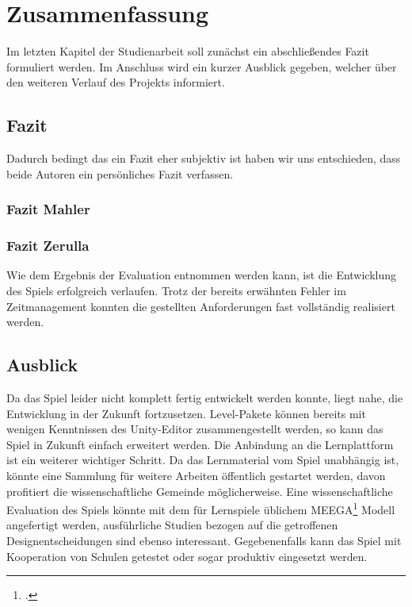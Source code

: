 \section{Zusammenfassung}
Im letzten Kapitel der Studienarbeit soll zunächst ein abschließendes Fazit formuliert werden. Im Anschluss wird ein kurzer Ausblick gegeben, welcher über den weiteren Verlauf des Projekts informiert.

\subsection{Fazit}

	Dadurch bedingt das ein Fazit eher subjektiv ist haben wir uns entschieden, dass beide Autoren ein persönliches Fazit verfassen.
	\subsubsection{Fazit Mahler}
	\subsubsection{Fazit Zerulla}

Wie dem Ergebnis der Evaluation entnommen werden kann, ist die Entwicklung des Spiels erfolgreich verlaufen. Trotz der bereits erwähnten Fehler im Zeitmanagement konnten die gestellten Anforderungen fast vollständig realisiert werden. 




\subsection{Ausblick}
	Da das Spiel leider nicht komplett fertig entwickelt werden konnte, liegt nahe, die Entwicklung in der Zukunft fortzusetzen. Level-Pakete können bereits mit wenigen Kenntnissen des Unity-Editor zusammengestellt werden, so kann das Spiel in Zukunft einfach erweitert werden. Die Anbindung an die Lernplattform ist ein weiterer wichtiger Schritt.
	Da das Lernmaterial vom Spiel unabhängig ist, könnte eine Sammlung für weitere Arbeiten öffentlich gestartet werden, davon profitiert die wissenschaftliche Gemeinde möglicherweise.
	Eine wissenschaftliche Evaluation des Spiels könnte mit dem für Lernspiele üblichem MEEGA\footcite{psych1} Modell angefertigt werden, ausführliche Studien bezogen auf die getroffenen Designentscheidungen sind ebenso interessant.
	Gegebenenfalls kann das Spiel mit Kooperation von Schulen getestet oder sogar produktiv eingesetzt werden.
